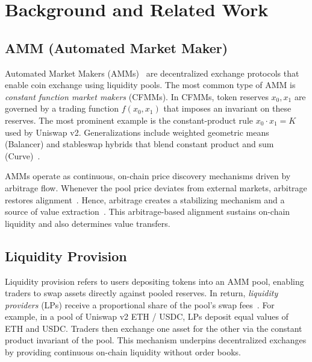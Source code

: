 \documentclass[journal]{IEEEtran}
\begin{document}
\section{Background and Related Work}
\label{sec:background}

\subsection{AMM (Automated Market Maker)}
Automated Market Makers (AMMs)~\cite{hertzog2017bancor} are decentralized exchange protocols that enable coin exchange using liquidity pools. 
The most common type of AMM is \emph{constant function market makers} (CFMMs). In CFMMs, token reserves $x_0, x_1$ are governed by a trading function $f(x_0,x_1)$ that imposes an invariant on these reserves.
The most prominent example is the constant-product rule $x_0 \cdot x_1 = K$ used by Uniswap v2. Generalizations include weighted geometric means (Balancer) and stableswap hybrids that blend constant product and sum (Curve)~\cite{bartoletti2022theory}.

AMMs operate as continuous, on-chain price discovery mechanisms driven by arbitrage flow. Whenever the pool price deviates from external markets, arbitrage restores alignment~\cite{angeris2020improved}. 
Hence, arbitrage creates a stabilizing mechanism and a source of value extraction~\cite{pusceddu2024lean}.
This arbitrage-based alignment sustains on-chain liquidity and also determines value transfers. %

\subsection{Liquidity Provision}
\label{sec:liquidity-provision}

Liquidity provision refers to users depositing tokens into an AMM pool, enabling traders to swap assets directly against pooled reserves. In return, \textit{liquidity providers} (LPs) receive a proportional share of the pool’s swap fees~\cite{gogol2024sok, chiu2023fragility, saengchote2023decentralized}.
For example, in a pool of Uniswap v2 ETH / USDC, LPs deposit equal values of ETH and USDC. Traders then exchange one asset for the other via the constant product invariant of the pool. This mechanism underpins decentralized exchanges by providing continuous on-chain liquidity without order books.
\end{document}
